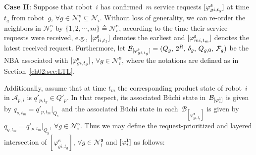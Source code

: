 
\textbf{Case II}: Suppose that robot~$i$ has confirmed~$m$ service requests $[\varphi_{gi,t_g}^{\textup{\texttt{s}}}]$ at time~$t_g$ from robot~$g$, $\forall g\in \mathcal{N}_i^\texttt{s}\subseteq \mathcal{N}_i$.
Without loss of generality, we can re-order the neighbors in $\mathcal{N}_{i}^\texttt{s}$ by $\{1,2,\cdots,m\}\triangleq \mathcal{N}_i^\texttt{s}$, according to the time their service requests were received, e.g., $[\varphi_{1i,t_1}^{\textup{\texttt{s}}}]$ denotes the earliest and
$[\varphi_{mi,t_m}^{\textup{\texttt{s}}}]$ denotes the latest received request.
Furthermore, let $\mathcal{B}_{[\varphi_{gi,t_g}^{\textup{\texttt{s}}}]}=(Q_g, \,2^{R},\, \delta_g,\, Q_{g,0},\, \mathcal{F}_g)$ be the NBA associated with $[\varphi_{gi,t_g}^{\textup{\texttt{s}}}]$, $\forall g \in \mathcal{N}_{i}^\texttt{s}$, where the notations are defined as in Section~\ref{ch02:sec:LTL}.

Additionally, assume that at time $t_m$ the corresponding product state of robot~$i$ in $\mathcal{A}_{p,i}$ is $q'_{p,t_g}\in Q'_p$. In that respect, its associated B\"uchi state in~$\mathcal{B}_{[\varphi_i^{\textup{\texttt{l}}}]}$ is given by $q_{s,t_m}=q'_{p,t_m}|_{Q_s}$ and the associated B\"uchi state in each~$\mathcal{B}_{[\varphi_{gi,t_g}^{\texttt{s}}]}$ is given by $q_{g,t_m}=q'_{p,t_m}|_{Q_g}$, $\forall g \in \mathcal{N}_i^\texttt{s}$.
Thus we may define the request-prioritized and layered intersection of $[\varphi_{gi,t_g}^{\texttt{s}}]$, $\forall g\in \mathcal{N}_i^\texttt{s}$ and $[\varphi_i^{\textup{\texttt{l}}}]$ as follows:


